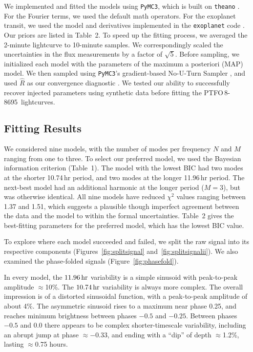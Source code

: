 \documentclass[12pt,twocolumn,tighten]{aastex62}
\newcommand{\ptfo}{PTFO$\,$8-8695}
\begin{document}
We implemented and fitted the models using \texttt{PyMC3}, which is
built on \texttt{theano}
\citep{salvatier_2016_PyMC3,exoplanet:theano}.
For the Fourier terms,
we used the default math operators.
For the exoplanet transit, we
used the model and derivatives implemented in the \texttt{exoplanet} code
\citep{exoplanet:exoplanet}.  Our priors are listed in Table~2.  To
speed up the fitting process, we averaged the 2-minute lightcurve
to 10-minute samples.  We correspondingly scaled the uncertainties in
the flux measurements by a factor of $\sqrt{5}$.  Before sampling, we
initialized each model with the parameters of the maximum a posteriori (MAP) model.
We then sampled using \texttt{PyMC3}'s gradient-based No-U-Turn Sampler
\citep{hoffman_no-u-turn_2014}, and used $\hat{R}$ as our convergence
diagnostic \citep{gelman_inference_1992}.  We tested our ability to
successfully recover injected parameters using synthetic data before
fitting the \ptfo\ lightcurves.


\subsection{Fitting Results}

We considered nine models, with the number of modes per frequency
$N$ and $M$ ranging from one to three.  To select our preferred model,
we used the Bayesian information criterion (Table~1).  The model with
the lowest BIC had two modes at the shorter 10.74$\,$hr period, and
two modes at the longer 11.96$\,$hr period.  The next-best model had
an additional harmonic at the longer period ($M=3$), but was otherwise
identical.  All nine models have reduced $\chi^2$ values ranging between 1.37
and 1.51, which suggests a plausible though imperfect agreement
between the data and the model to within the formal uncertainties.
Table~2 gives the best-fitting parameters for the preferred model,
which has the lowest BIC value.

To explore where each model succeeded and failed, we split the raw
signal into its respective components (Figures~\ref{fig:splitsignal}
and~\ref{fig:splitsignalii}).  We also examined the phase-folded
signals (Figure~\ref{fig:phasefold}).  

In every model, the $11.96\,{\rm hr}$ variability is a simple sinusoid
with peak-to-peak amplitude $\approx$10\%.  The $10.74\,{\rm hr}$
variability is always more complex.  The overall impression is of
a distorted sinusoidal function,
with a peak-to-peak
amplitude of about 4\%.
The asymmetric sinusoid rises to a maximum near phase 0.25,
and reaches minimum brightness between phases $-0.5$ and $-0.25$.
Between phases $-0.5$ and $0.0$ there appears to be complex shorter-timescale variability, 
including an abrupt jump at phase $\approx -0.33$,
and ending with a ``dip'' 
of depth $\approx$1.2\%, lasting $\approx$0.75 hours.  
\end{document}
